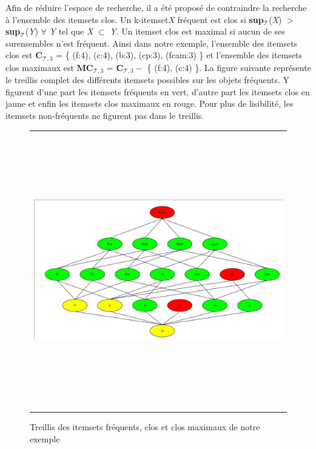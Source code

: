 \documentclass[a4paper,10pt]{report}
\begin{document}
	Afin de réduire l'espace de recherche, il a été proposé de contraindre la recherche à l'ensemble des itemsets clos. Un k-itemset\emph{X} fréquent est clos si \textbf{sup$_{\mathcal{T}}$}(\emph{X}) $>$ \textbf{sup$_{\mathcal{T}}$}(\emph{Y}) $ \forall  $ \emph{Y} tel que \emph{X} $ \subset $ \emph{Y}.  Un itemset clos est maximal si aucun de ses surensembles n'est fréquent. Ainsi dans notre exemple, l'ensemble des itemsets clos est   $\textbf{C}_{\mathcal{T},3}$ = \{ (f:4), (c:4), (b:3), (cp:3), (fcam:3) \} et l'ensemble des itemsets clos maximaux est  $\textbf{MC}_{\mathcal{T},3}$ =  $\textbf{C}_{\mathcal{T},3} - $ \{ (f:4), (c:4) \}. La figure suivante représente le treillis complet des différents itemsets possibles sur les objets fréquents. Y figurent d'une part les itemsets fréquents en vert, d'autre part les itemsets clos en jaune et enfin les itemsets clos maximaux en rouge. Pour plus de lisibilité, les itemsets non-fréquents ne figurent pas dans le treillis.\\

\begin{figure}
	\begin{adjustwidth}{-2.7cm}{}
	\begin{tabular}{l}
	\includegraphics[width=15cm,height=12cm]{./img/treillis_is.jpg}\\
	\end{tabular}
	\caption{\label{fig:text}Treillis des itemsets fréquents, clos et clos maximaux de notre exemple}
	\end{adjustwidth}
\end{figure}
\end{document}
